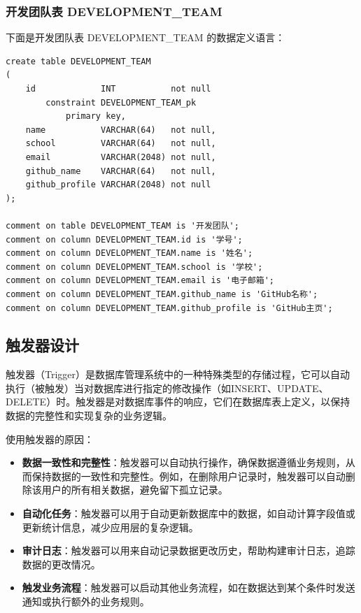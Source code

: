 \subsubsection{开发团队表 DEVELOPMENT\_TEAM}

下面是开发团队表 DEVELOPMENT\_TEAM 的数据定义语言：

\begin{verbatim}
create table DEVELOPMENT_TEAM
(
    id             INT           not null
        constraint DEVELOPMENT_TEAM_pk
            primary key,
    name           VARCHAR(64)   not null,
    school         VARCHAR(64)   not null,
    email          VARCHAR(2048) not null,
    github_name    VARCHAR(64)   not null,
    github_profile VARCHAR(2048) not null
);

comment on table DEVELOPMENT_TEAM is '开发团队';
comment on column DEVELOPMENT_TEAM.id is '学号';
comment on column DEVELOPMENT_TEAM.name is '姓名';
comment on column DEVELOPMENT_TEAM.school is '学校';
comment on column DEVELOPMENT_TEAM.email is '电子邮箱';
comment on column DEVELOPMENT_TEAM.github_name is 'GitHub名称';
comment on column DEVELOPMENT_TEAM.github_profile is 'GitHub主页';
\end{verbatim}

\subsection{触发器设计}

触发器（Trigger）是数据库管理系统中的一种特殊类型的存储过程，它可以自动执行（被触发）当对数据库进行指定的修改操作（如INSERT、UPDATE、DELETE）时。触发器是对数据库事件的响应，它们在数据库表上定义，以保持数据的完整性和实现复杂的业务逻辑。

使用触发器的原因：

\begin{itemize}
    \item \textbf{数据一致性和完整性}：触发器可以自动执行操作，确保数据遵循业务规则，从而保持数据的一致性和完整性。例如，在删除用户记录时，触发器可以自动删除该用户的所有相关数据，避免留下孤立记录。
    \item \textbf{自动化任务}：触发器可以用于自动更新数据库中的数据，如自动计算字段值或更新统计信息，减少应用层的复杂逻辑。
    \item \textbf{审计日志}：触发器可以用来自动记录数据更改历史，帮助构建审计日志，追踪数据的更改情况。
    \item \textbf{触发业务流程}：触发器可以启动其他业务流程，如在数据达到某个条件时发送通知或执行额外的业务规则。
\end{itemize}

